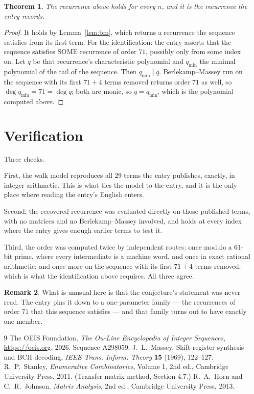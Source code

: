 \documentclass[11pt,a4paper]{article}
\theoremstyle{plain}
\newtheorem{theorem}{Theorem}
\theoremstyle{definition}
\newtheorem{remark}[theorem]{Remark}
\begin{document}
\begin{theorem}
The recurrence above holds for every $n$, and it is the recurrence the entry records.
\end{theorem}

\begin{proof}
It holds by Lemma~\ref{lem:bm}, which returns a recurrence the sequence satisfies from its
first term. For the identification: the entry asserts that the sequence satisfies SOME
recurrence of order $71$, possibly only from some index on. Let $q$ be that recurrence's
characteristic polynomial and $q_{\min}$ the minimal polynomial of the tail of the sequence.
Then $q_{\min}\mid q$. Berlekamp--Massey run on the sequence with its first $71+4$ terms
removed returns order $71$ as well, so $\deg q_{\min}=71=\deg q$; both are monic, so
$q=q_{\min}$, which is the polynomial computed above.
\end{proof}

\section{Verification}

Three checks.

First, the walk model reproduces all $29$ terms the entry publishes, exactly, in integer
arithmetic. This is what ties the model to the entry, and it is the only place where reading
the entry's English enters.

Second, the recovered recurrence was evaluated directly on those published terms, with no
matrices and no Berlekamp--Massey involved, and holds at every index where the entry gives
enough earlier terms to test it.

Third, the order was computed twice by independent routes: once modulo a $61$-bit prime, where
every intermediate is a machine word, and once in exact rational arithmetic; and once more on
the sequence with its first $71+4$ terms removed, which is what the identification above
requires. All three agree.

\begin{remark}
What is unusual here is that the conjecture's statement was never read. The entry pins it down
to a one-parameter family --- the recurrences of order $71$ that this sequence satisfies
--- and that family turns out to have exactly one member.
\end{remark}

\begin{thebibliography}{9}
 The OEIS Foundation, \emph{The On-Line Encyclopedia of Integer
Sequences}, \url{https://oeis.org}, 2026. Sequence A298059.
 J.~L.~Massey, Shift-register synthesis and BCH decoding, \emph{IEEE
Trans. Inform. Theory} \textbf{15} (1969), 122--127.
 R.~P.~Stanley, \emph{Enumerative Combinatorics}, Volume 1, 2nd ed.,
Cambridge University Press, 2011. (Transfer-matrix method, Section 4.7.)
 R.~A.~Horn and C.~R.~Johnson, \emph{Matrix Analysis}, 2nd ed., Cambridge
University Press, 2013.
\end{thebibliography}
\end{document}
